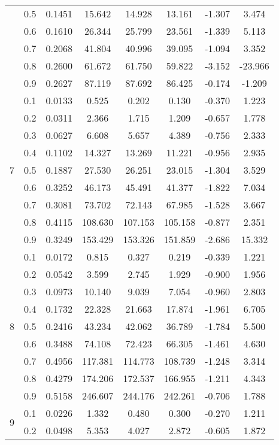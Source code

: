 \documentclass[11pt,a4paper]{report}
\begin{document}
\begin{longtable}{ | c | c || c | c | c | c | c | c | }
 & 0.5 & 0.1451 & 15.642 & 14.928 & 13.161 & -1.307 & 3.474 \\
 & 0.6 & 0.1610 & 26.344 & 25.799 & 23.561 & -1.339 & 5.113 \\
 & 0.7 & 0.2068 & 41.804 & 40.996 & 39.095 & -1.094 & 3.352 \\
 & 0.8 & 0.2600 & 61.672 & 61.750 & 59.822 & -3.152 & -23.966 \\
 & 0.9 & 0.2627 & 87.119 & 87.692 & 86.425 & -0.174 & -1.209 \\
 \hline
\multirow{9}{*}{7} & 0.1 & 0.0133 & 0.525 & 0.202 & 0.130 & -0.370 & 1.223 \\
 & 0.2 & 0.0311 & 2.366 & 1.715 & 1.209 & -0.657 & 1.778 \\
 & 0.3 & 0.0627 & 6.608 & 5.657 & 4.389 & -0.756 & 2.333 \\
 & 0.4 & 0.1102 & 14.327 & 13.269 & 11.221 & -0.956 & 2.935 \\
 & 0.5 & 0.1887 & 27.530 & 26.251 & 23.015 & -1.304 & 3.529 \\
 & 0.6 & 0.3252 & 46.173 & 45.491 & 41.377 & -1.822 & 7.034 \\
 & 0.7 & 0.3081 & 73.702 & 72.143 & 67.985 & -1.528 & 3.667 \\
 & 0.8 & 0.4115 & 108.630 & 107.153 & 105.158 & -0.877 & 2.351 \\
 & 0.9 & 0.3249 & 153.429 & 153.326 & 151.859 & -2.686 & 15.332 \\
 \hline
\multirow{9}{*}{8} & 0.1 & 0.0172 & 0.815 & 0.327 & 0.219 & -0.339 & 1.221 \\
 & 0.2 & 0.0542 & 3.599 & 2.745 & 1.929 & -0.900 & 1.956 \\
 & 0.3 & 0.0973 & 10.140 & 9.039 & 7.054 & -0.960 & 2.803 \\
 & 0.4 & 0.1732 & 22.328 & 21.663 & 17.874 & -1.961 & 6.705 \\
 & 0.5 & 0.2416 & 43.234 & 42.062 & 36.789 & -1.784 & 5.500 \\
 & 0.6 & 0.3488 & 74.108 & 72.423 & 66.305 & -1.461 & 4.630 \\
 & 0.7 & 0.4956 & 117.381 & 114.773 & 108.739 & -1.248 & 3.314 \\
 & 0.8 & 0.4279 & 174.206 & 172.537 & 166.955 & -1.211 & 4.343 \\
 & 0.9 & 0.5158 & 246.607 & 244.176 & 242.261 & -0.706 & 1.788 \\
 \hline
\multirow{9}{*}{9} & 0.1 & 0.0226 & 1.332 & 0.480 & 0.300 & -0.270 & 1.211 \\
 & 0.2 & 0.0498 & 5.353 & 4.027 & 2.872 & -0.605 & 1.872 \\

\end{longtable}
\end{document}
